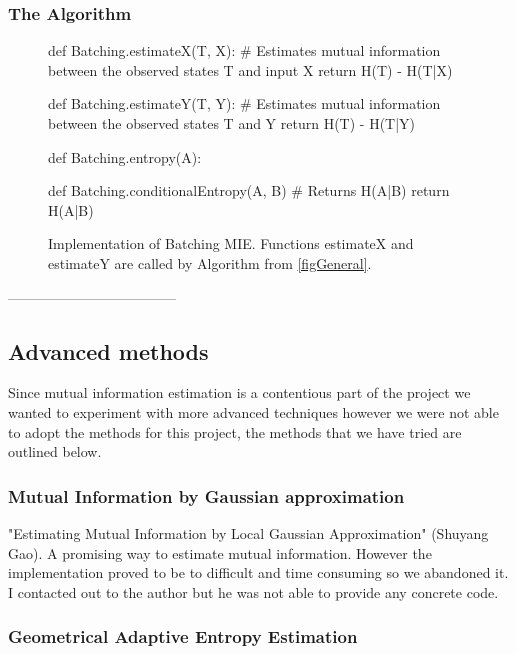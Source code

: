 \documentclass[dissertation.tex]{subfiles}
\begin{document}
\subsubsection{The Algorithm}
\begin{figure}[H]
    \begin{pythonfigure}
      def Batching.estimateX(T, X): 
        # Estimates mutual information between the observed states T and input X
        return H(T) - H(T|X)

      def Batching.estimateY(T, Y): 
        # Estimates mutual information between the observed states T and Y
        return H(T) - H(T|Y)

      def Batching.entropy(A):

      def Batching.conditionalEntropy(A, B)
        # Returns H(A|B)
        return H(A|B)
    \end{pythonfigure}
    \caption{
      Implementation of Batching MIE. Functions estimateX and estimateY are
      called by Algorithm from \autoref{figGeneral}.
    }
    \label{figBatching}
\end{figure}
\newpage

------------------------------------
\subsection{Advanced methods} \label{ssection:advanced}

Since mutual information estimation is a contentious part of the project we
wanted to experiment with more advanced techniques however we were not able to
adopt the methods for this project, the methods that we have tried are outlined
below.

\subsubsection{Mutual Information by Gaussian approximation}
  
  "Estimating Mutual Information by Local Gaussian Approximation" (Shuyang Gao). A
  promising way to estimate mutual information. However the implementation
  proved to be to difficult and time consuming so we abandoned it. I contacted
  out to the author but he was not able to provide any concrete code.

\subsubsection{Geometrical Adaptive Entropy Estimation}
\end{document}
